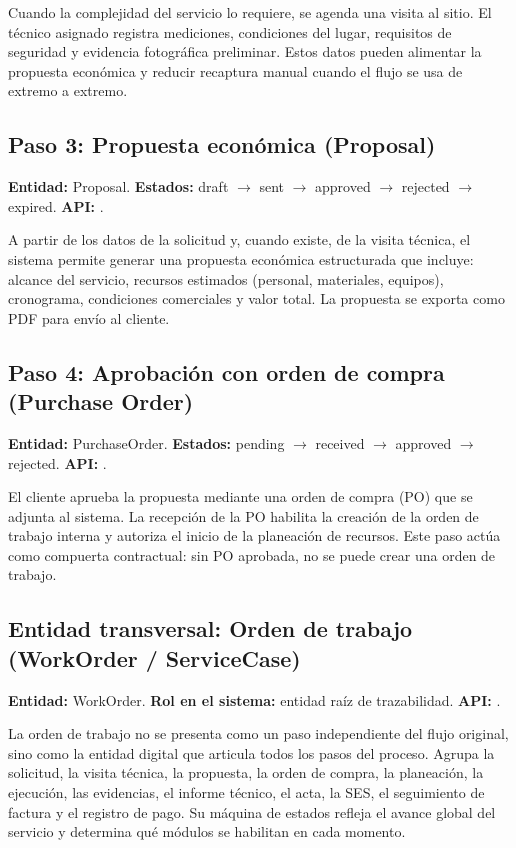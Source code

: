 Cuando la complejidad del servicio lo requiere, se agenda una visita al sitio. El técnico asignado registra mediciones, condiciones del lugar, requisitos de seguridad y evidencia fotográfica preliminar. Estos datos pueden alimentar la propuesta económica y reducir recaptura manual cuando el flujo se usa de extremo a extremo.

\subsection{Paso 3: Propuesta económica (Proposal)}

\textbf{Entidad:} Proposal. \textbf{Estados:} draft $\rightarrow$ sent $\rightarrow$ approved $\rightarrow$ rejected $\rightarrow$ expired. \textbf{API:} .

A partir de los datos de la solicitud y, cuando existe, de la visita técnica, el sistema permite generar una propuesta económica estructurada que incluye: alcance del servicio, recursos estimados (personal, materiales, equipos), cronograma, condiciones comerciales y valor total. La propuesta se exporta como PDF para envío al cliente.

\subsection{Paso 4: Aprobación con orden de compra (Purchase Order)}

\textbf{Entidad:} PurchaseOrder. \textbf{Estados:} pending $\rightarrow$ received $\rightarrow$ approved $\rightarrow$ rejected. \textbf{API:} .

El cliente aprueba la propuesta mediante una orden de compra (PO) que se adjunta al sistema. La recepción de la PO habilita la creación de la orden de trabajo interna y autoriza el inicio de la planeación de recursos. Este paso actúa como compuerta contractual: sin PO aprobada, no se puede crear una orden de trabajo.

\subsection{Entidad transversal: Orden de trabajo (WorkOrder / ServiceCase)}

\textbf{Entidad:} WorkOrder. \textbf{Rol en el sistema:} entidad raíz de trazabilidad. \textbf{API:} .

La orden de trabajo no se presenta como un paso independiente del flujo original, sino como la entidad digital que articula todos los pasos del proceso. Agrupa la solicitud, la visita técnica, la propuesta, la orden de compra, la planeación, la ejecución, las evidencias, el informe técnico, el acta, la SES, el seguimiento de factura y el registro de pago. Su máquina de estados refleja el avance global del servicio y determina qué módulos se habilitan en cada momento.

